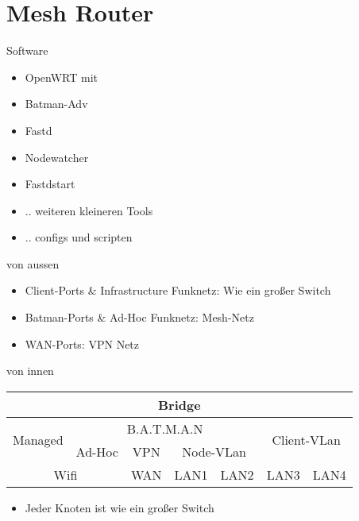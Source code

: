 \section{Mesh Router}

\begin{frame}{Software}
    \begin{itemize}
        \item OpenWRT mit
        \item Batman-Adv
        \item Fastd
        \item Nodewatcher
        \item Fastdstart
        \item .. weiteren kleineren Tools
        \item .. configs und scripten
    \end{itemize}
\end{frame}

\begin{frame}{von aussen}
    \begin{itemize}
        \item Client-Ports \& Infrastructure Funknetz:
            Wie ein großer Switch
        \item Batman-Ports \& Ad-Hoc Funknetz:
            Mesh-Netz
        \item WAN-Ports:
            VPN Netz
    \end{itemize}
\end{frame}

\begin{frame}{von innen}
    \renewcommand{\arraystretch}{1.5}
    \begin{tabular}{|c|c|c|c|c|c|c|} \hline
         \multicolumn{7}{|c|}{Bridge} \\ \hline
         \multirow{2}{*}{Managed} &
         \multicolumn{4}{c|}{B.A.T.M.A.N} &
         \multicolumn{2}{c|}{\multirow{2}{*}{Client-VLan}} \\ \cline{2-5}
         & Ad-Hoc & VPN & \multicolumn{2}{c|}{Node-VLan} & \multicolumn{2}{c|}{} \\ \hline
         \multicolumn{2}{|c|}{Wifi} & WAN & LAN1 & LAN2 &
         LAN3 & LAN4 \\ \hline
    \end{tabular}

    \begin{itemize}
        \item Jeder Knoten ist wie ein großer Switch
    \end{itemize}
\end{frame}

